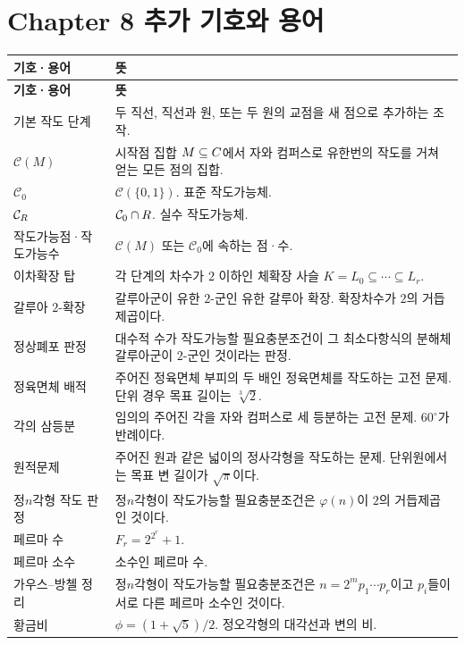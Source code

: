 \chapter*{Chapter 8 추가 기호와 용어}

\renewcommand{\arraystretch}{1.2}
\begin{longtable}{>{\raggedright\arraybackslash}p{}>{\raggedright\arraybackslash}p{}}
\toprule
\textbf{기호·용어} & \textbf{뜻} \\
\midrule
\endfirsthead
\toprule
\textbf{기호·용어} & \textbf{뜻} \\
\midrule
\endhead
\bottomrule
\endfoot

기본 작도 단계 & 두 직선, 직선과 원, 또는 두 원의 교점을 새 점으로 추가하는 조작. \\
$\mathcal C(M)$ & 시작점 집합 $M\subseteq C$에서 자와 컴퍼스로 유한번의 작도를 거쳐 얻는 모든 점의 집합. \\
$\mathcal C_0$ & $\mathcal C(\{0,1\})$. 표준 작도가능체. \\
$\mathcal C_{R}$ & $\mathcal C_0\cap R$. 실수 작도가능체. \\
작도가능점·작도가능수 & $\mathcal C(M)$ 또는 $\mathcal C_0$에 속하는 점·수. \\
이차확장 탑 & 각 단계의 차수가 $2$ 이하인 체확장 사슬 $K=L_0\subseteq\cdots\subseteq L_r$. \\
갈루아 $2$-확장 & 갈루아군이 유한 $2$-군인 유한 갈루아 확장. 확장차수가 $2$의 거듭제곱이다. \\
정상폐포 판정 & 대수적 수가 작도가능할 필요충분조건이 그 최소다항식의 분해체 갈루아군이 $2$-군인 것이라는 판정. \\
정육면체 배적 & 주어진 정육면체 부피의 두 배인 정육면체를 작도하는 고전 문제. 단위 경우 목표 길이는 $\sqrt[3]2$. \\
각의 삼등분 & 임의의 주어진 각을 자와 컴퍼스로 세 등분하는 고전 문제. $60^\circ$가 반례이다. \\
원적문제 & 주어진 원과 같은 넓이의 정사각형을 작도하는 문제. 단위원에서는 목표 변 길이가 $\sqrt\pi$이다. \\
정$n$각형 작도 판정 & 정$n$각형이 작도가능할 필요충분조건은 $\varphi(n)$이 $2$의 거듭제곱인 것이다. \\
페르마 수 & $F_r=2^{2^r}+1$. \\
페르마 소수 & 소수인 페르마 수. \\
가우스--방첼 정리 & 정$n$각형이 작도가능할 필요충분조건은 $n=2^m p_1\cdots p_r$이고 $p_i$들이 서로 다른 페르마 소수인 것이다. \\
황금비 & $\phi=(1+\sqrt5)/2$. 정오각형의 대각선과 변의 비. \\

\end{longtable}
